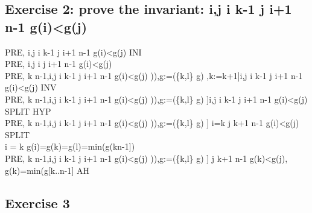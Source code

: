 \documentclass[11pt,a4paper,fleqn]{article}
\begin{document}
\subsection{Exercise 2: prove the invariant: \forall i,j \cdot i  \upto k-1 \wedge j \in i+1 \upto n-1 \Rightarrow g(i)<g(j)}
\noindent
PRE, \vdash [k:=0]\forall i,j \cdot i  \upto k-1 \wedge j \in i+1 \upto n-1 \Rightarrow g(i)<g(j) \; INI \\
PRE, \vdash \forall i,j \cdot i   \wedge j \in i+1 \upto n-1 \Rightarrow g(i)<g(j) \\
PRE, k \neq n-1,\forall i,j \cdot i  \upto k-1 \wedge j \in i+1 \upto n-1 \Rightarrow g(i)<g(j) \vdash [l:=g^{-1}(min(g[k\upto n-1])),g:=(\{k,l\} \domsub g) ,k:=k+1]\forall i,j \cdot i  \upto k-1 \wedge j \in i+1 \upto n-1 \Rightarrow g(i)<g(j) \; INV \\ 
PRE, k \neq n-1,\forall i,j \cdot i  \upto k-1 \wedge j \in i+1 \upto n-1 \Rightarrow g(i)<g(j) \vdash [l:=g^{-1}(min(g[k\upto n-1])),g:=(\{k,l\} \domsub g) ]\forall i,j \cdot i  \upto k-1 \wedge j \in i+1 \upto n-1 \Rightarrow g(i)<g(j) \;SPLIT \;HYP\\
PRE, k \neq n-1,\forall i,j \cdot i  \upto k-1 \wedge j \in i+1 \upto n-1 \Rightarrow g(i)<g(j) \vdash [l:=g^{-1}(min(g[k\upto n-1])),g:=(\{k,l\} \domsub g) ] i=k \wedge j \in k+1 \upto n-1 \Rightarrow g(i)<g(j) \;SPLIT \\
i = k \vdash g(i)=g(k)=g(l)=min(g(k\upto n-1]) \\
PRE, k \neq n-1,\forall i,j \cdot i  \upto k-1 \wedge j \in i+1 \upto n-1 \Rightarrow g(i)<g(j) \vdash [l:=g^{-1}(min(g[k\upto n-1])),g:=(\{k,l\} \domsub g) ] j \in k+1 \upto n-1 \Rightarrow g(k)<g(j), g(k)=min(g[k..n-1] \; AH \\

\subsection{Exercise 3}








%
%
\end{document}
